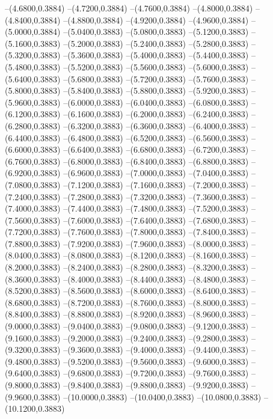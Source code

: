 {	--(4.6800,0.3884)
	--(4.7200,0.3884)
	--(4.7600,0.3884)
	--(4.8000,0.3884)
	--(4.8400,0.3884)
	--(4.8800,0.3884)
	--(4.9200,0.3884)
	--(4.9600,0.3884)
	--(5.0000,0.3884)
	--(5.0400,0.3883)
	--(5.0800,0.3883)
	--(5.1200,0.3883)
	--(5.1600,0.3883)
	--(5.2000,0.3883)
	--(5.2400,0.3883)
	--(5.2800,0.3883)
	--(5.3200,0.3883)
	--(5.3600,0.3883)
	--(5.4000,0.3883)
	--(5.4400,0.3883)
	--(5.4800,0.3883)
	--(5.5200,0.3883)
	--(5.5600,0.3883)
	--(5.6000,0.3883)
	--(5.6400,0.3883)
	--(5.6800,0.3883)
	--(5.7200,0.3883)
	--(5.7600,0.3883)
	--(5.8000,0.3883)
	--(5.8400,0.3883)
	--(5.8800,0.3883)
	--(5.9200,0.3883)
	--(5.9600,0.3883)
	--(6.0000,0.3883)
	--(6.0400,0.3883)
	--(6.0800,0.3883)
	--(6.1200,0.3883)
	--(6.1600,0.3883)
	--(6.2000,0.3883)
	--(6.2400,0.3883)
	--(6.2800,0.3883)
	--(6.3200,0.3883)
	--(6.3600,0.3883)
	--(6.4000,0.3883)
	--(6.4400,0.3883)
	--(6.4800,0.3883)
	--(6.5200,0.3883)
	--(6.5600,0.3883)
	--(6.6000,0.3883)
	--(6.6400,0.3883)
	--(6.6800,0.3883)
	--(6.7200,0.3883)
	--(6.7600,0.3883)
	--(6.8000,0.3883)
	--(6.8400,0.3883)
	--(6.8800,0.3883)
	--(6.9200,0.3883)
	--(6.9600,0.3883)
	--(7.0000,0.3883)
	--(7.0400,0.3883)
	--(7.0800,0.3883)
	--(7.1200,0.3883)
	--(7.1600,0.3883)
	--(7.2000,0.3883)
	--(7.2400,0.3883)
	--(7.2800,0.3883)
	--(7.3200,0.3883)
	--(7.3600,0.3883)
	--(7.4000,0.3883)
	--(7.4400,0.3883)
	--(7.4800,0.3883)
	--(7.5200,0.3883)
	--(7.5600,0.3883)
	--(7.6000,0.3883)
	--(7.6400,0.3883)
	--(7.6800,0.3883)
	--(7.7200,0.3883)
	--(7.7600,0.3883)
	--(7.8000,0.3883)
	--(7.8400,0.3883)
	--(7.8800,0.3883)
	--(7.9200,0.3883)
	--(7.9600,0.3883)
	--(8.0000,0.3883)
	--(8.0400,0.3883)
	--(8.0800,0.3883)
	--(8.1200,0.3883)
	--(8.1600,0.3883)
	--(8.2000,0.3883)
	--(8.2400,0.3883)
	--(8.2800,0.3883)
	--(8.3200,0.3883)
	--(8.3600,0.3883)
	--(8.4000,0.3883)
	--(8.4400,0.3883)
	--(8.4800,0.3883)
	--(8.5200,0.3883)
	--(8.5600,0.3883)
	--(8.6000,0.3883)
	--(8.6400,0.3883)
	--(8.6800,0.3883)
	--(8.7200,0.3883)
	--(8.7600,0.3883)
	--(8.8000,0.3883)
	--(8.8400,0.3883)
	--(8.8800,0.3883)
	--(8.9200,0.3883)
	--(8.9600,0.3883)
	--(9.0000,0.3883)
	--(9.0400,0.3883)
	--(9.0800,0.3883)
	--(9.1200,0.3883)
	--(9.1600,0.3883)
	--(9.2000,0.3883)
	--(9.2400,0.3883)
	--(9.2800,0.3883)
	--(9.3200,0.3883)
	--(9.3600,0.3883)
	--(9.4000,0.3883)
	--(9.4400,0.3883)
	--(9.4800,0.3883)
	--(9.5200,0.3883)
	--(9.5600,0.3883)
	--(9.6000,0.3883)
	--(9.6400,0.3883)
	--(9.6800,0.3883)
	--(9.7200,0.3883)
	--(9.7600,0.3883)
	--(9.8000,0.3883)
	--(9.8400,0.3883)
	--(9.8800,0.3883)
	--(9.9200,0.3883)
	--(9.9600,0.3883)
	--(10.0000,0.3883)
	--(10.0400,0.3883)
	--(10.0800,0.3883)
	--(10.1200,0.3883)
}
